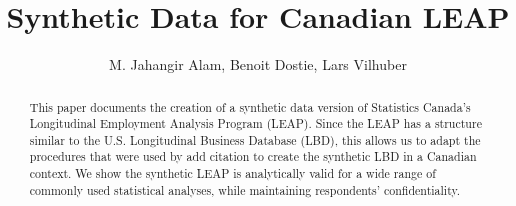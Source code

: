 \documentclass{article}
\title{Synthetic Data for Canadian LEAP}
\author{M. Jahangir Alam, Benoit Dostie, Lars Vilhuber}
\begin{document}
\maketitle
{}
\begin{abstract}
\noindent
This paper documents the creation of a synthetic data version of Statistics Canada's Longitudinal Employment Analysis Program (LEAP). Since the LEAP has a structure similar to the U.S. Longitudinal Business Database (LBD), this allows us to adapt the procedures that were used by {add citation} to create the synthetic LBD in a Canadian context. We show the synthetic LEAP is analytically valid for a wide range of commonly used statistical analyses, while maintaining respondents' confidentiality.
\end{abstract}
\newpage
\tableofcontents
\newpage
\end{document}
